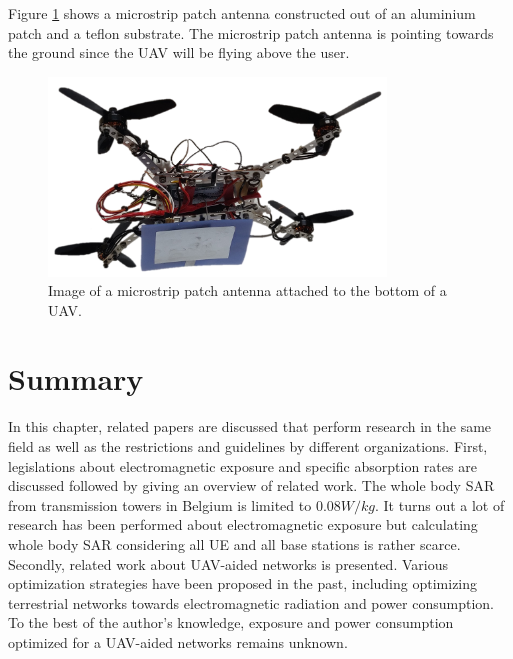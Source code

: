 Figure \ref{fig:exampleDrone} shows a microstrip patch antenna 
constructed out of an aluminium patch and a teflon substrate. The microstrip patch 
antenna is pointing towards the ground since the \gls{UAV} will be flying above the user.

\begin{figure}[H]
\centering
  \includegraphics[width=0.8\textwidth]{../images/drone.png}
  \caption{Image of a microstrip patch antenna attached to the bottom of a \gls{UAV}. }
  \label{fig:exampleDrone}
\end{figure}


\section{Summary}
In this chapter, related papers are discussed that perform research in the same field as well
as the restrictions and guidelines by different organizations.
First, legislations about electromagnetic exposure and specific absorption rates are discussed followed 
by giving an overview of related work. The whole body \gls{SAR} from transmission towers in Belgium is limited to $0.08 W/kg$. It turns out a lot of research has been performed about electromagnetic exposure
but calculating whole body \gls{SAR} considering all \gls{UE} and all base stations is rather scarce.
Secondly, related work about \gls{UAV}-aided networks is presented. Various optimization strategies 
have been proposed in the past, including optimizing terrestrial networks towards electromagnetic radiation and power consumption. 
To the best of the author's knowledge, 
 exposure and power consumption optimized for a \gls{UAV}-aided networks remains unknown.

